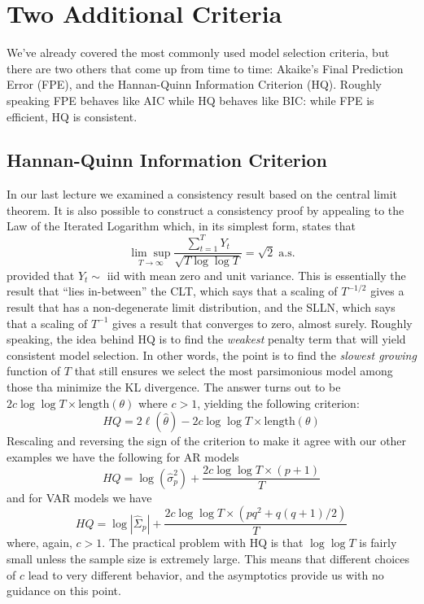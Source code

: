 \documentclass[12pt]{article}
\theoremstyle{definition}
\begin{document}
\section{Two Additional Criteria}
We've already covered the most commonly used model selection criteria, but there are two others that come up from time to time: Akaike's Final Prediction Error (FPE), and the Hannan-Quinn Information Criterion (HQ). Roughly speaking FPE behaves like AIC while HQ behaves like BIC: while FPE is efficient, HQ is consistent.

\subsection{Hannan-Quinn Information Criterion}
In our last lecture we examined a consistency result based on the central limit theorem. It is also possible to construct a consistency proof by appealing to the Law of the Iterated Logarithm which, in its simplest form, states that
	$$\underset{T \rightarrow \infty}{\lim \sup}\frac{\sum_{t=1}^T Y_t}{\sqrt{T \log \log T}} = \sqrt{2} \; \mbox{a.s.}$$
provided that $Y_t \sim$ iid with mean zero and unit variance. This is essentially the result that ``lies in-between'' the CLT, which says that a scaling of $T^{-1/2}$ gives a result that has a non-degenerate limit distribution, and the SLLN, which says that a scaling of $T^{-1}$ gives a result that converges to zero, almost surely. Roughly speaking, the idea behind HQ is to find the \emph{weakest} penalty term that will yield consistent model selection. In other words, the point is to find the \emph{slowest growing} function of $T$ that still ensures we select the most parsimonious model among those tha minimize the KL divergence. The answer turns out to be $2c \log \log T \times \mbox{length}(\theta) $ where $c > 1$, yielding the following criterion:
	$$HQ = 2 \ell(\widehat{\theta}) - 2c \log \log T \times \mbox{length}(\theta) $$
Rescaling and reversing the sign of the criterion to make it agree with our other examples we have the following for AR models
	$$HQ = \log\left(\widehat{\sigma}^2_p \right) + \frac{2c \log \log T \times (p+1)}{T}$$
and for VAR models we have
	$$HQ = \log \left| \widehat{\Sigma}_p\right| +  \frac{2c \log\log T \times (pq^2 + q(q+1)/2)}{T}$$
where, again, $c > 1$. The practical problem with HQ is that $\log \log T$ is fairly small unless the sample size is extremely large. This means that different choices of $c$ lead to very different behavior, and the asymptotics provide us with no guidance on this point. 
\end{document}
